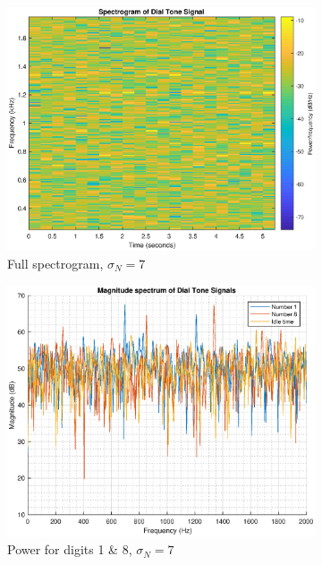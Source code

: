 \documentclass{article}
\begin{document}
\begin{figure}[h!]
\begin{subfigure}{0.32\textwidth}
\includegraphics[width = \textwidth]{dtp_spec_n7}
\caption{Full spectrogram, $\sigma_N=7$}
\label{fig:dtp_spec_n7}
\end{subfigure}
\begin{subfigure}{0.32\textwidth}
\centering
\includegraphics[width = \textwidth]{dtp_magspec_n7}
\caption{Power for digits 1 \& 8, $\sigma_N=7$}
\label{fig:dtp_magspec_n7}
\end{subfigure}
\begin{subfigure}{0.32\textwidth}
\centering

\end{subfigure}
\end{figure}
\end{document}
